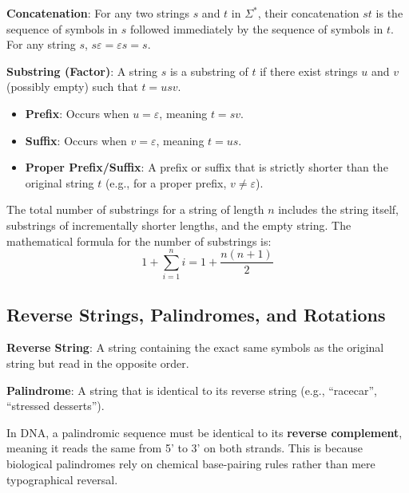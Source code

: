 \begin{important}
    \textbf{Concatenation}: For any two strings \(s\) and \(t\) in \(\Sigma^*\), their concatenation \(st\) is the sequence of symbols in \(s\) followed immediately by the sequence of symbols in \(t\). For any string \(s\), \(s\varepsilon = \varepsilon s = s\).
\end{important}

\begin{important}
    \textbf{Substring (Factor)}: A string \(s\) is a substring of \(t\) if there exist strings \(u\) and \(v\) (possibly empty) such that \(t = usv\).
    \begin{itemize}
        \item \textbf{Prefix}: Occurs when \(u = \varepsilon\), meaning \(t = sv\).
        \item \textbf{Suffix}: Occurs when \(v = \varepsilon\), meaning \(t = us\).
        \item \textbf{Proper Prefix/Suffix}: A prefix or suffix that is strictly shorter than the original string \(t\) (e.g., for a proper prefix, \(v \neq \varepsilon\)).
    \end{itemize}
\end{important}

The total number of substrings for a string of length \(n\) includes the string itself, substrings of incrementally shorter lengths, and the empty string. The mathematical formula for the number of substrings is:
\begin{equation}
    1 + \sum_{i=1}^{n} i = 1 + \frac{n(n+1)}{2}
\end{equation}

\subsection{Reverse Strings, Palindromes, and Rotations}

\begin{important}
    \textbf{Reverse String}: A string containing the exact same symbols as the original string but read in the opposite order.
\end{important}

\begin{important}
    \textbf{Palindrome}: A string that is identical to its reverse string (e.g., ``racecar'', ``stressed desserts'').
\end{important}

\sta In DNA, a palindromic sequence must be identical to its \textbf{reverse complement}, meaning it reads the same from 5' to 3' on both strands. This is because biological palindromes rely on chemical base-pairing rules rather than mere typographical reversal.

